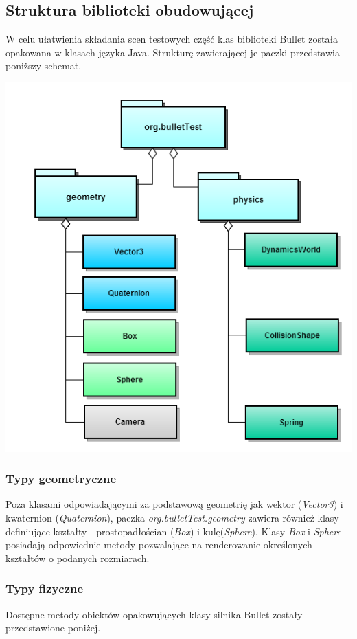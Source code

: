 \subsection{Struktura biblioteki obudowującej}
W celu ułatwienia składania scen testowych część klas biblioteki Bullet została
opakowana w klasach języka Java. Strukturę zawierającej je paczki przedstawia
poniższy schemat.
\begin{center}
\includegraphics[scale=0.5]{./img/packageDiagram.png}
\end{center}

\subsubsection{Typy geometryczne}
Poza klasami odpowiadającymi za podstawową geometrię jak wektor (\emph{Vector3})
i kwaternion (\emph{Quaternion}), paczka \emph{org.bulletTest.geometry} zawiera
również klasy definiujące kształty - prostopadłościan (\emph{Box}) i
kulę(\emph{Sphere}). Klasy \emph{Box} i \emph{Sphere} posiadają
odpowiednie metody pozwalające na renderowanie określonych kształtów
o podanych rozmiarach.

\subsubsection{Typy fizyczne}
Dostępne metody obiektów opakowujących klasy silnika Bullet zostały
przedstawione poniżej.

